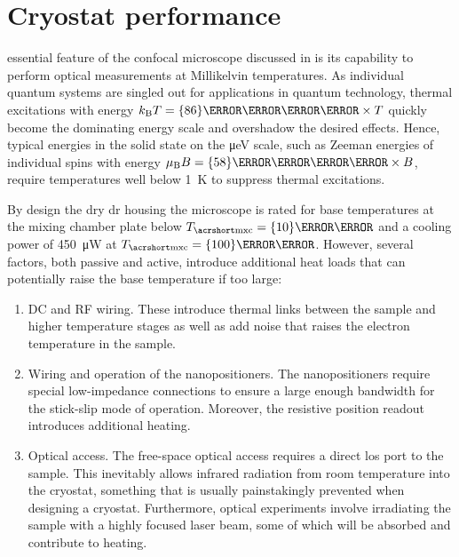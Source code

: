 \chapter{Cryostat performance}\label{ch:setup:cooling}
 essential feature of the confocal microscope discussed in \thethesis is its capability to perform optical measurements at Millikelvin temperatures.
As individual quantum systems are singled out for applications in quantum technology, thermal excitations with energy $\kb T = \qty{86}{\micro\eV\per\kelvin}\times T$ quickly become the dominating energy scale and overshadow the desired effects.
Hence, typical energies in the solid state on the \unit{\micro\eV} scale, such as Zeeman energies of individual spins with energy $\mub B = \qty{58}{\micro\eV\per\tesla}\times B$, require temperatures well below \qty{1}{\kelvin} to suppress thermal excitations.

By design the \odin dry \gls{dr} housing the microscope is rated for base temperatures at the mixing chamber plate below $\Tmxc=\qty{10}{\milli\kelvin}$ and a cooling power of \qty{450}{\micro\watt} at $\Tmxc=\qty{100}{\milli\kelvin}$.
However, several factors, both passive and active, introduce additional heat loads that can potentially raise the base temperature if too large:
\begin{enumerate}
    \item \label{itm:setup:cooling:wiring}
    DC and RF wiring.
    These introduce thermal links between the sample and higher temperature stages as well as add noise that raises the electron temperature in the sample.
    \item \label{itm:setup:cooling:positioners}
    Wiring and operation of the \positioner nanopositioners.
    The nanopositioners require special low-impedance connections to ensure a large enough bandwidth for the stick-slip mode of operation.
    Moreover, the resistive position readout introduces additional heating.
    \item \label{itm:setup:cooling:optical}
    Optical access.
    The free-space optical access requires a direct \gls{los} port to the sample.
    This inevitably allows infrared radiation from room temperature into the cryostat, something that is usually painstakingly prevented when designing a cryostat.
    Furthermore, optical experiments involve irradiating the sample with a highly focused laser beam, some of which will be absorbed and contribute to heating.
\end{enumerate}

